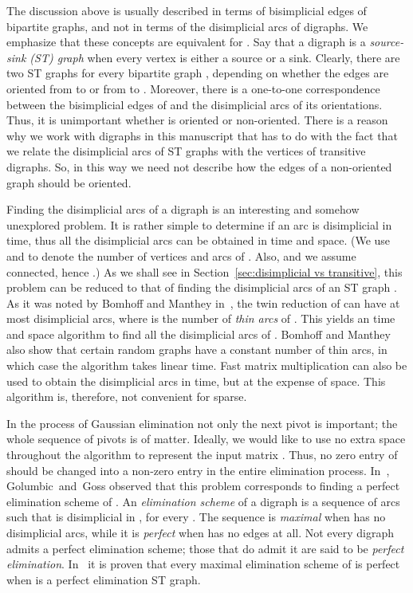 \documentclass[a4paper,11pt]{article}
\begin{document}
The discussion above is usually described in terms of bisimplicial edges of bipartite graphs, and not in terms of the disimplicial arcs of digraphs.  We emphasize that these concepts are equivalent for .  Say that a digraph is a \emph{source-sink (ST) graph} when every vertex is either a source or a sink.  Clearly, there are two ST graphs for every bipartite graph , depending on whether the edges are oriented from  to  or from  to .  Moreover, there is a one-to-one correspondence between the bisimplicial edges of  and the disimplicial arcs of its orientations.  Thus, it is unimportant whether  is oriented or non-oriented.  There is a reason why we work with digraphs in this manuscript that has to do with the fact that we relate the disimplicial arcs of ST graphs with the vertices of transitive digraphs.  So, in this way we need not describe how the edges of a non-oriented graph should be oriented.

Finding the disimplicial arcs of a digraph  is an interesting and somehow unexplored problem.  It is rather simple to determine if an arc is disimplicial in  time, thus all the disimplicial arcs can be obtained in  time and  space.  (We use  and  to denote the number of vertices and arcs of .  Also, and we assume  connected, hence .)  As we shall see in Section~\ref{sec:disimplicial vs transitive}, this problem can be reduced to that of finding the disimplicial arcs of an ST graph .  As it was noted by Bomhoff and Manthey in~\cite{BomhoffMantheyDAM2013}, the twin reduction  of  can have at most  disimplicial arcs, where  is the number of \emph{thin arcs} of .  This yields an  time and  space algorithm to find all the disimplicial arcs of .  Bomhoff and Manthey also show that certain random graphs have a constant number of thin arcs, in which case the algorithm takes linear time.  Fast matrix multiplication can also be used to obtain the disimplicial arcs in  time, but at the expense of  space.  This algorithm is, therefore, not convenient for  sparse.

In the process of Gaussian elimination not only the next pivot is important; the whole sequence of pivots is of matter.  Ideally, we would like to use no extra space throughout the algorithm to represent the input matrix .  Thus, no zero entry of  should be changed into a non-zero entry in the entire elimination process.  In~\cite{GolumbicGossJGT1978}, Golumbic~and~Goss observed that this problem corresponds to finding a perfect elimination scheme of .  An \emph{elimination scheme} of a digraph  is a sequence of arcs  such that  is disimplicial in , for every .  The sequence  is \emph{maximal} when  has no disimplicial arcs, while it is \emph{perfect} when  has no edges at all.  Not every digraph admits a perfect elimination scheme; those that do admit it are said to be \emph{perfect elimination}.  In~\cite{GolumbicGossJGT1978} it is proven that every maximal elimination scheme of  is perfect when  is a perfect elimination ST graph.  
\end{document}
